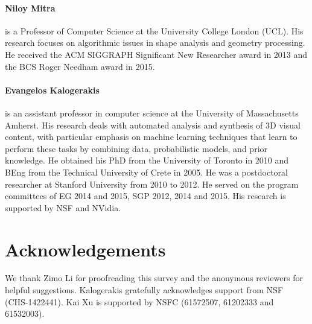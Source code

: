 \paragraph*{Niloy Mitra} is a Professor of Computer Science at the University College London (UCL). His research focuses on algorithmic issues in shape analysis and geometry processing. He received the ACM SIGGRAPH Significant New Researcher award in 2013 and the BCS Roger Needham award in 2015.



\paragraph*{Evangelos Kalogerakis} is an assistant professor in computer science at the University of Massachusetts Amherst. His research deals with automated analysis and synthesis of 3D visual content, with particular emphasis on machine learning techniques that learn to perform these tasks by combining data, probabilistic models, and prior knowledge. He obtained his PhD from the University of Toronto in 2010 and BEng from the Technical University of Crete in 2005. He was a postdoctoral researcher at Stanford University from 2010 to 2012.  He served on the program committees of EG 2014 and 2015, SGP 2012, 2014 and 2015. His research is supported by NSF and NVidia.


\section*{Acknowledgements}
We thank Zimo Li for proofreading this survey and the anonymous reviewers for helpful suggestions.
Kalogerakis gratefully acknowledges support from NSF (CHS-1422441).
Kai Xu is supported by NSFC (61572507, 61202333 and 61532003).
